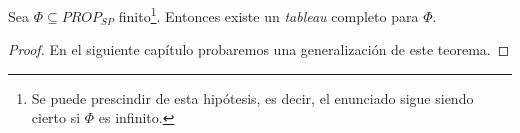 \begin{prop}\label{compi}
Sea $\Phi \subseteq PROP_{SP}$ finito\footnote{Se puede prescindir de esta hipótesis, es decir, el enunciado sigue siendo cierto si $\Phi$ es infinito.}. Entonces existe un \textit{tableau} completo para $\Phi$.
\end{prop}
\begin{proof}
En el siguiente capítulo probaremos una generalización de este teorema.

\end{proof}

